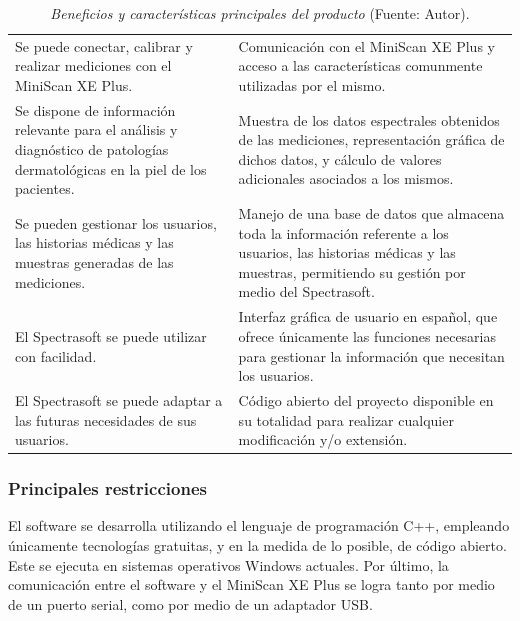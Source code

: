 	\begin{table}[h]
		\small
		\caption[Beneficios y caracter\'{i}sticas principales del producto]{\textit{Beneficios y caracter\'{i}sticas principales del producto} (Fuente: Autor).}
		\centering
		\setlength{\extrarowheight}{\altocelda}
		\begin{tabulary}{\anchotabla}{|J|J|}
			\hline
			 & \\ \hline
			Se puede conectar, calibrar y realizar mediciones con el MiniScan XE Plus. & 
			Comunicaci\'{o}n con el MiniScan XE Plus y acceso a las caracter\'{i}sticas comunmente utilizadas por el mismo.\\ \hline
			Se dispone de informaci\'{o}n relevante para el an\'{a}lisis y diagn\'{o}stico de patolog\'{i}as dermatol\'{o}gicas en la piel de los pacientes. &
			Muestra de los datos espectrales obtenidos de las mediciones, representaci\'{o}n gr\'{a}fica de dichos datos, y c\'{a}lculo de valores adicionales asociados a los mismos.\\ \hline
			Se pueden gestionar los usuarios, las historias m\'{e}dicas y las muestras generadas de las mediciones. &
			Manejo de una base de datos que almacena toda la informaci\'{o}n referente a los usuarios, las historias m\'{e}dicas y las muestras, permitiendo su gesti\'{o}n por medio del Spectrasoft.\\ \hline
			El Spectrasoft se puede utilizar con facilidad. &
			Interfaz gr\'{a}fica de usuario en espa\~{n}ol, que ofrece \'{u}nicamente las funciones necesarias para gestionar la informaci\'{o}n que necesitan los usuarios. \\ \hline
			El Spectrasoft se puede adaptar a las futuras necesidades de sus usuarios. &
			C\'{o}digo abierto del proyecto disponible en su totalidad para realizar cualquier modificaci\'{o}n y/o extensi\'{o}n.\\ \hline
		\end{tabulary}
	\end{table}
	
	\subsubsection{Principales restricciones}
	
	El software se desarrolla utilizando el lenguaje de programaci\'{o}n C++, empleando \'{u}nicamente tecnolog\'{i}as gratuitas, y en la medida de lo posible, de c\'{o}digo abierto. Este se ejecuta en sistemas operativos Windows actuales. Por \'{u}ltimo, la comunicaci\'{o}n entre el software y el MiniScan XE Plus se logra tanto por medio de un puerto serial, como por medio de un adaptador USB.
	
